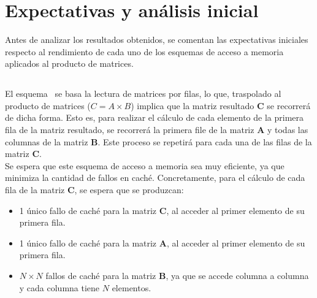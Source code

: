 \pagestyle{fancy}
\fancyhead[l]{\autorUO}
\fancyfoot[l]{\asignaturaAbbr}
\fancyfoot[r]{\fecha}

\section{Expectativas y análisis inicial} \label{sec:1}
Antes de analizar los resultados obtenidos, se comentan las expectativas iniciales respecto al rendimiento de cada uno de 
los esquemas de acceso a memoria aplicados al producto de matrices.

\subsection{\rowmajor}
El esquema \rowmajor\ se basa la lectura de matrices por filas, lo que, traspolado al producto de matrices (\( C = A \times B \))
implica que la matriz resultado \textbf{C} se recorrerá de dicha forma. Esto es, para realizar el cálculo de cada elemento de la primera fila de la matriz 
resultado, se recorrerá la primera file de la matriz \textbf{A} y todas las columnas de la matriz \textbf{B}. Este proceso se repetirá para cada una 
de las filas de la matriz \textbf{C}. \\
Se espera que este esquema de acceso a memoria sea muy eficiente, ya que minimiza la cantidad de fallos en caché. Concretamente, 
para el cálculo de cada fila de la matriz \textbf{C}, se espera que se produzcan:
\begin{itemize}
    \item 1 único fallo de caché para la matriz \textbf{C}, al acceder al primer elemento de su primera fila.
    \item 1 único fallo de caché para la matriz \textbf{A}, al acceder al primer elemento de su primera fila.
    \item \(N \times N\) fallos de caché para la matriz \textbf{B}, ya que se accede columna a columna y cada columna tiene \(N\) elementos.
\end{itemize}

